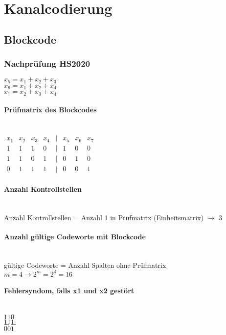 

\section{Kanalcodierung}

\subsection{Blockcode}
\subsubsection{Nachprüfung HS2020}
$x_5=x_1+x_2+x_3$\\
$x_6=x_1+x_2+x_4$\\
$x_7=x_2+x_3+x_4$

\paragraph{Prüfmatrix des Blockcodes}\mbox{}\\
$\begin{matrix}
    x_1 & x_2 & x_3 & x_4 & | & x_5 & x_6 & x_7\\
    1 & 1 & 1 & 0 & | & 1 & 0 & 0\\
    1 & 1 & 0 & 1 & | & 0 & 1 & 0\\
    0 & 1 & 1 & 1 & | & 0 & 0 & 1
\end{matrix}$

\paragraph{Anzahl Kontrollstellen}\mbox{}\\
Anzahl Kontrollstellen = Anzahl 1 in Prüfmatrix (Einheitsmatrix) $\rightarrow$ 3

\paragraph{Anzahl gültige Codeworte mit Blockcode}\mbox{}\\
gültige Codeworte = Anzahl Spalten ohne Prüfmatrix\\
$m=4 \rightarrow 2^m=2^4=16$

\paragraph{Fehlersyndom, falls x1 und x2 gestört}\mbox{}\\
$110$\\
$111$\\
$--$\\
$001$

